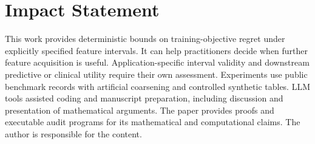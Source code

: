 \documentclass{article}
\begin{document}
\printAffiliationsAndNotice{}

\clearpage
{}
\section*{Impact Statement}
This work provides deterministic bounds on training-objective regret under explicitly specified feature intervals. It can help practitioners decide when further feature acquisition is useful. Application-specific interval validity and downstream predictive or clinical utility require their own assessment. Experiments use public benchmark records with artificial coarsening and controlled synthetic tables. LLM tools assisted coding and manuscript preparation, including discussion and presentation of mathematical arguments. The paper provides proofs and executable audit programs for its mathematical and computational claims. The author is responsible for the content.

\clearpage
\appendix

\end{document}
